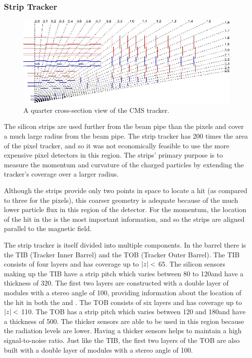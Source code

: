 \subsubsection{Strip Tracker}

\begin{figure}[!htbp]
    \centering
    \includegraphics[width=\textwidth]{figures/strip_layout.jpg}
    \caption{
        A quarter cross-section view of the CMS tracker.
    }
    \label{fig:strip_layout}
\end{figure}

The silicon strips are used further from the beam pipe than the pixels and
cover a much large radius from the beam pipe. The strip tracker has 200 times
the area of the pixel tracker, and so it was not economically feasible to use
the more expensive pixel detectors in this region. The strips' primary purpose
is to measure the momentum and curvature of the charged particles by extending
the tracker's coverage over a larger radius.

Although the strips provide only two points in space to locate a hit (as
compared to three for the pixels), this coarser geometry is adequate because of
the much lower particle flux in this region of the detector. For the momentum,
the location of the hit in the \rphiplane is the most important information,
and so the strips are aligned parallel to the magnetic field.

The strip tracker is itself divided into multiple components. In the barrel
there is the TIB (Tracker Inner Barrel) and the TOB (Tracker Outer Barrel). The
TIB consists of four layers and has coverage up to $|z|<$ 65\centimeters.
The silicon sensors making up the TIB have a strip pitch which varies between
80 to 120\micrometers and have a thickness of 320\micrometers. The first two
layers are constructed with a double layer of modules with a stereo angle of
100\millirads, providing information about the location of the hit in both the
\coordrphi and \rzplane. The TOB consists of six layers and has coverage up to
$|z|<$ 110\centimeters. The TOB has a strip pitch which varies between
120 and 180\micrometers and have a thickness of 500\micrometers. The thicker
sensors are able to be used in this region because the radiation levels are
lower. Having a thicker sensors helps to maintain a high signal-to-noise ratio.
Just like the TIB, the first two layers of the TOB are also built with a double
layer of modules with a stereo angle of 100\millirads.

